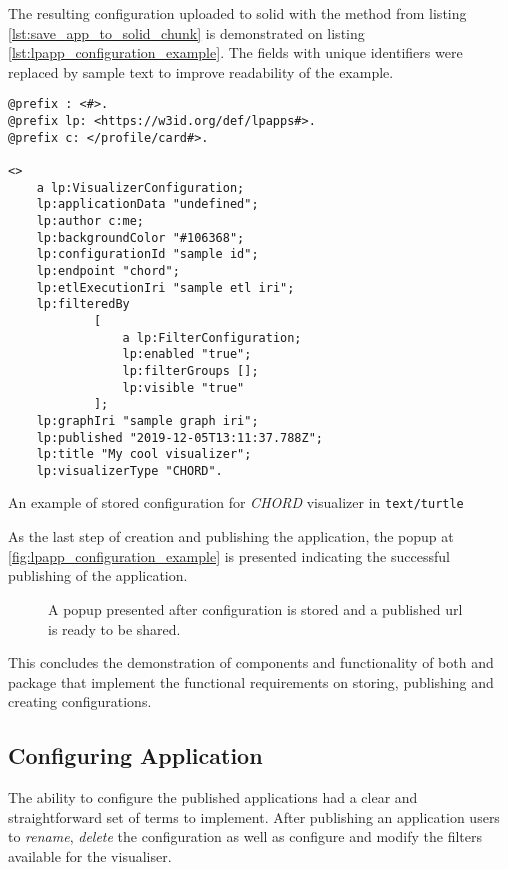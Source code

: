 The resulting \lpa{} configuration uploaded to solid with the method from listing \autoref{lst:save_app_to_solid_chunk} is demonstrated on listing \autoref{lst:lpapp_configuration_example}. The fields with unique identifiers were replaced by sample text to improve readability of the example. 

\begin{listing}[H]    
\begin{verbatim}
@prefix : <#>.
@prefix lp: <https://w3id.org/def/lpapps#>.
@prefix c: </profile/card#>.

<>
    a lp:VisualizerConfiguration;
    lp:applicationData "undefined";
    lp:author c:me;
    lp:backgroundColor "#106368";
    lp:configurationId "sample id";
    lp:endpoint "chord";
    lp:etlExecutionIri "sample etl iri";
    lp:filteredBy
            [
                a lp:FilterConfiguration;
                lp:enabled "true";
                lp:filterGroups [];
                lp:visible "true"
            ];
    lp:graphIri "sample graph iri";
    lp:published "2019-12-05T13:11:37.788Z";
    lp:title "My cool visualizer";
    lp:visualizerType "CHORD".
\end{verbatim}
\caption{An example of stored \lpa{} configuration for \textit{CHORD} visualizer in \texttt{text/turtle}} 
\label{lst:lpapp_configuration_example}
\end{listing}

As the last step of creation and publishing the \lpa{} application, the popup at \autoref{fig:lpapp_configuration_example} is presented indicating the successful publishing of the application. 

\begin{figure}[h]
\centering
{}
\caption{A popup presented after configuration is stored and a published url is ready to be shared.}
\label{fig:lpa_published_app_popup}
\end{figure}

This concludes the demonstration of components and functionality of both \lpa{} and \lpas{} package that implement the functional requirements on storing, publishing and creating \lpa{} configurations. 

\subsection{Configuring Application}

The ability to configure the published applications had a clear and straightforward set of terms to implement. After publishing an application \lpa{} users  to \textit{rename}, \textit{delete} the configuration as well as configure and modify the filters available for the visualiser.

